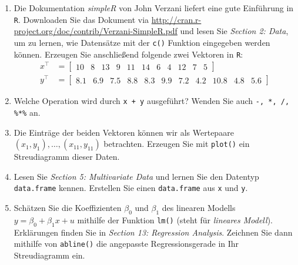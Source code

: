 \begin{enumerate}

\item Die Dokumentation \emph{simpleR} von John Verzani liefert eine gute Einführung in \texttt{R}. Downloaden Sie das Dokument via \href{http://cran.r-project.org/doc/contrib/Verzani-SimpleR.pdf}{http://cran.r-project.org/doc/contrib/Verzani-SimpleR.pdf} und lesen Sie \emph{Section 2: Data}, um zu lernen, wie Datensätze mit der \texttt{c()} Funktion eingegeben werden können. Erzeugen Sie anschließend folgende zwei Vektoren in \texttt{R}:
\setcounter{MaxMatrixCols}{11}
\begin{align*}
x^\top &=
\begin{bmatrix}
10 & 8 & 13 & 9 & 11 & 14 & 6 & 4 & 12 & 7 & 5
\end{bmatrix}
\\
y^\top &=
\begin{bmatrix}
8.1 & 6.9 & 7.5 & 8.8 & 8.3 & 9.9 & 7.2 & 4.2 & 10.8 & 4.8 & 5.6
\end{bmatrix}
\end{align*}


\item Welche Operation wird durch \texttt{x + y} ausgeführt? Wenden Sie auch \texttt{-, *, /, \%*\%} an.


\item Die Einträge der beiden Vektoren können wir als Wertepaare $(x_1,y_1), \ldots, (x_{11}, y_{11})$ betrachten. Erzeugen Sie mit \texttt{plot()} ein Streudiagramm dieser Daten.


\item Lesen Sie \emph{Section 5: Multivariate Data} und lernen Sie den Datentyp \texttt{data.frame} kennen. Erstellen Sie einen \texttt{data.frame} aus \texttt{x} und \texttt{y}.


\item Schätzen Sie die Koeffizienten $\beta_0$ und $\beta_1$ des linearen Modells $y = \beta_0 + \beta_1 x + u$ mithilfe der Funktion \texttt{lm()} (steht für \emph{lineares Modell}). Erklärungen finden Sie in \emph{Section 13: Regression Analysis}. Zeichnen Sie dann mithilfe von \texttt{abline()} die angepasste Regressionsgerade in Ihr Streudiagramm ein.


\end{enumerate}
